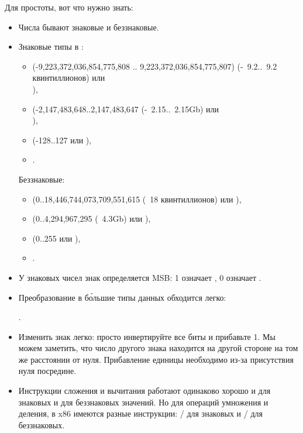 Для простоты, вот что нужно знать:

\begin{itemize}
\item Числа бывают знаковые и беззнаковые.

\item Знаковые типы в \CCpp:

  \begin{itemize}
    \item {} (-9,223,372,036,854,775,808 .. 9,223,372,036,854,775,807) 
	  (-~9.2..~9.2 квинтиллионов) или \\
                ),
    \item \Tint (-2,147,483,648..2,147,483,647 (-~2.15..~2.15Gb) или \\
	    ),
    \item \Tchar (-128..127 или ),
    \item {}.
   \end{itemize}

	Беззнаковые:
  \begin{itemize}
	  \item {} (0..18,446,744,073,709,551,615 
		  (~18 квинтиллионов) или ),
   \item {} (0..4,294,967,295 (~4.3Gb) или ),
   \item {} (0..255 или ), 
   \item {}.
  \end{itemize}

\item У знаковых чисел знак определяется \ac{MSB}: 1 означает , 0 означает .

\item Преобразование в б\'{о}льшие типы данных обходится легко:

	.

\label{sec:signednumbers:negation}
\item Изменить знак легко: просто инвертируйте все биты и прибавьте 1.
Мы можем заметить, что число другого знака находится на другой стороне на том же расстоянии от нуля.
Прибавление единицы необходимо из-за присутствия нуля посредине.

\item Инструкции сложения и вычитания работают одинаково хорошо и для знаковых и для беззнаковых значений.
	Но для операций умножения и деления, в x86 имеются разные инструкции:
	/ для знаковых и / для беззнаковых.


\end{itemize}
